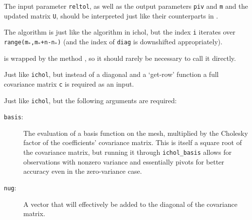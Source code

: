 \documentclass{manual}
\begin{document}
\begin{description}
    The input parameter \texttt{reltol}, as well as the output parameters \texttt{piv} and \texttt{m} and the updated matrix \texttt{U}, should be interpreted just like their counterparts in . 
    
    The algorithm is just like the algorithm in ichol, but the index \texttt{i} iterates over \texttt{range(m$_*$,m$_*$+n-n$_*$)} (and the index of \texttt{diag} is downshifted appropriately).
    
     is wrapped by the  method , so it should rarely be necessary to call it directly. 
    
    \item[\function{U, m, piv = ichol_full(c, reltol)}:] Just like \texttt{ichol}, but instead of a diagonal and a `get-row' function a full covariance matrix \texttt{c} is required as an input.
    
    \item[\function{U, m, piv = ichol_full(basis, nug, reltol)}:] Just like \texttt{ichol}, but the following arguments are required:
    \begin{description}
        \item[\texttt{basis}:] The evaluation of a basis function on the mesh, multiplied by the Cholesky factor of the coefficients' covariance matrix. This is itself a square root of the covariance matrix, but running it through \texttt{ichol_basis} allows for observations with nonzero variance and essentially pivots for better accuracy even in the zero-variance case.
        \item[\texttt{nug}:] A vector that will effectively be added to the diagonal of the covariance matrix.
    \end{description}
\end{description}
\end{document}

